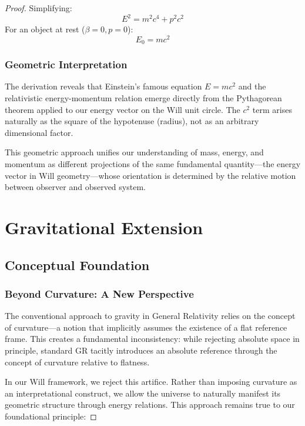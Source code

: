 \documentclass{article}
\begin{document}
\begin{theorem}
\begin{proof}
Simplifying:
\begin{equation}
    \boxed{E^2 = m^2 c^4 + p^2 c^2}
\end{equation}
For an object at rest ($\beta = 0, p = 0$):
\begin{equation}
    \boxed{E_0 = mc^2}
\end{equation}

\subsubsection{Geometric Interpretation}

The derivation reveals that Einstein's famous equation $E=mc^2$ and the relativistic energy-momentum relation emerge directly from the Pythagorean theorem applied to our energy vector on the Will unit circle. The $c^2$ term arises naturally as the square of the hypotenuse (radius), not as an arbitrary dimensional factor.

This geometric approach unifies our understanding of mass, energy, and momentum as different projections of the same fundamental quantity—the energy vector in Will geometry—whose orientation is determined by the relative motion between observer and observed system.

\section{Gravitational Extension}

\subsection{Conceptual Foundation}

\subsubsection{Beyond Curvature: A New Perspective}

The conventional approach to gravity in General Relativity relies on the concept of curvature—a notion that implicitly assumes the existence of a flat reference frame. This creates a fundamental inconsistency: while rejecting absolute space in principle, standard GR tacitly introduces an absolute reference through the concept of curvature relative to flatness.

In our Will framework, we reject this artifice. Rather than imposing curvature as an interpretational construct, we allow the universe to naturally manifest its geometric structure through energy relations. This approach remains true to our foundational principle:


\end{proof}
\end{theorem}
\end{document}
